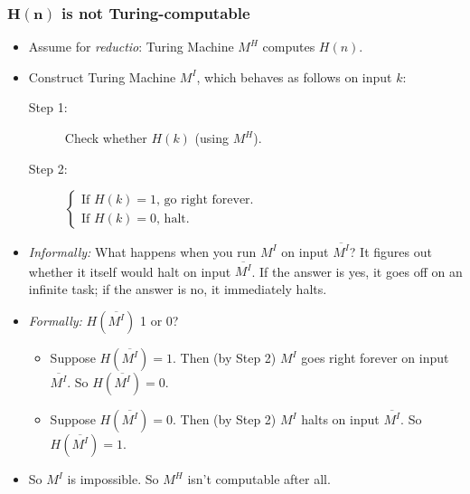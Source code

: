 \documentclass[12pt]{extarticle}
\begin{document}
\subsubsection{$\bm{H(n)}$ is not Turing-computable}




\begin{itemize}

\item Assume for \emph{reductio}: Turing Machine \(M^{H}\) computes \(H(n)\). 

\item Construct Turing Machine \(M^I\), which behaves as follows on input $k$:

\begin{description}
\item[Step 1:] Check whether $H(k)$ (using \(M^H\)). 

\item[Step 2:] 
$\begin{cases}
\text{If $H(k)=1$, go right forever.} \\

\text{If  $H(k)=0$, halt}.

\end{cases}$
\end{description}

\item \emph{Informally:} What happens when you run $M^I$ on input $\overline{M^I}$? It figures out whether it itself would halt on input $\overline{M^I}$. If the answer is yes, it goes off on an infinite task; if the answer is no, it immediately halts.

\item \emph{Formally:} $H(\overline{M^I})$ 1 or 0?

\begin{itemize}
\item Suppose $H(\overline{M^I}) = 1$. Then (by Step 2)  $M^I$ goes right forever on input $\overline{M^I}$. So $H(\overline{M^I}) = 0$.

\item Suppose $H(\overline{M^I}) = 0$. Then (by Step 2) $M^I$ halts on input $\overline{M^I}$. So $H(\overline{M^I}) = 1$.

\end{itemize}

\item So $M^I$ is impossible. So $M^H$ isn't computable after all.


\end{itemize}
\end{document}
